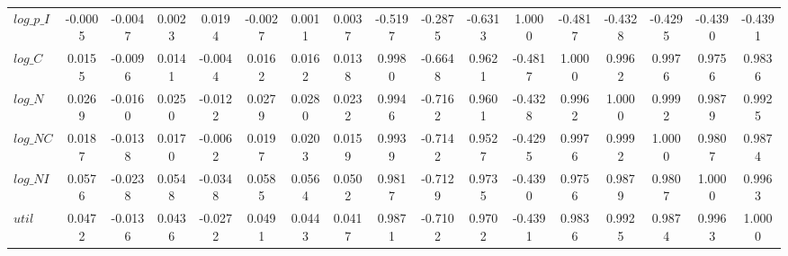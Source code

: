 \begin{center}
\begin{longtable}{lcccccccccccccccc}
$log\_p\_I       $	 & 	           -0.0005	 & 	           -0.0047	 & 	            0.0023	 & 	            0.0194	 & 	           -0.0027	 & 	            0.0011	 & 	            0.0037	 & 	           -0.5197	 & 	           -0.2875	 & 	           -0.6313	 & 	            1.0000	 & 	           -0.4817	 & 	           -0.4328	 & 	           -0.4295	 & 	           -0.4390	 & 	           -0.4391 \\ 
$log\_C          $	 & 	            0.0155	 & 	           -0.0096	 & 	            0.0141	 & 	           -0.0044	 & 	            0.0162	 & 	            0.0162	 & 	            0.0138	 & 	            0.9980	 & 	           -0.6648	 & 	            0.9621	 & 	           -0.4817	 & 	            1.0000	 & 	            0.9962	 & 	            0.9976	 & 	            0.9756	 & 	            0.9836 \\ 
$log\_N          $	 & 	            0.0269	 & 	           -0.0160	 & 	            0.0250	 & 	           -0.0122	 & 	            0.0279	 & 	            0.0280	 & 	            0.0232	 & 	            0.9946	 & 	           -0.7162	 & 	            0.9601	 & 	           -0.4328	 & 	            0.9962	 & 	            1.0000	 & 	            0.9992	 & 	            0.9879	 & 	            0.9925 \\ 
$log\_NC         $	 & 	            0.0187	 & 	           -0.0138	 & 	            0.0170	 & 	           -0.0062	 & 	            0.0197	 & 	            0.0203	 & 	            0.0159	 & 	            0.9939	 & 	           -0.7142	 & 	            0.9527	 & 	           -0.4295	 & 	            0.9976	 & 	            0.9992	 & 	            1.0000	 & 	            0.9807	 & 	            0.9874 \\ 
$log\_NI         $	 & 	            0.0576	 & 	           -0.0238	 & 	            0.0548	 & 	           -0.0348	 & 	            0.0585	 & 	            0.0564	 & 	            0.0502	 & 	            0.9817	 & 	           -0.7129	 & 	            0.9735	 & 	           -0.4390	 & 	            0.9756	 & 	            0.9879	 & 	            0.9807	 & 	            1.0000	 & 	            0.9963 \\ 
${util}          $	 & 	            0.0472	 & 	           -0.0136	 & 	            0.0436	 & 	           -0.0272	 & 	            0.0491	 & 	            0.0443	 & 	            0.0417	 & 	            0.9871	 & 	           -0.7102	 & 	            0.9702	 & 	           -0.4391	 & 	            0.9836	 & 	            0.9925	 & 	            0.9874	 & 	            0.9963	 & 	            1.0000 \\ 
\end{longtable}
 \end{center}
